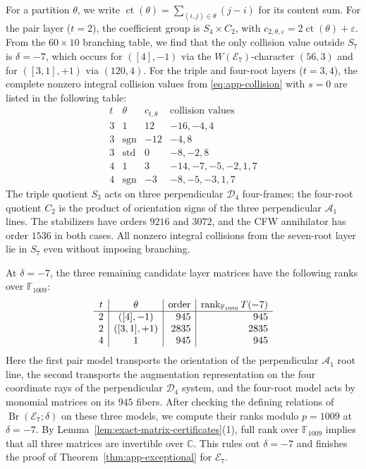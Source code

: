 \documentclass[11pt,a4paper]{amsart}
\newcommand{\C}{\mathbb C}\newcommand{\Q}{\mathbb Q}\newcommand{\Z}{\mathbb Z}
\newcommand{\Br}{\operatorname{Br}}\newcommand{\Irr}{\operatorname{Irr}}
\theoremstyle{uprightdefinition}
\theoremstyle{remark}\newtheorem{remark}[theorem]{Remark}
\begin{document}
For a partition $\theta$, we write
$\operatorname{ct}(\theta)=\sum_{(i,j)\in\theta}(j-i)$ for its content sum. For the pair layer ($t=2$), the coefficient group is
$S_4\times C_2$, with
$c_{2,\theta,\varepsilon}=2\operatorname{ct}(\theta)+\varepsilon$.
From the $60\times10$ branching table, we find that the only collision value outside $S_7$ is $\delta=-7$, which occurs for
$([4],-1)$ via the $W(\mathscr{E}_7)$-character $(56,3)$ and for
$([3,1],+1)$ via $(120,4)$.
For the triple and four-root layers ($t=3,4$), the complete nonzero integral
collision values from \eqref{eq:app-collision} with $s=0$ are listed in the following table:
\[
\begin{array}{c|c|r|l}
 t&\theta&c_{t,\theta}&\text{collision values}\\\hline
 3&1&12&-16,-4,4\\
 3&\mathrm{sgn}&-12&-4,8\\
 3&\mathrm{std}&0&-8,-2,8\\
 4&1&3&-14,-7,-5,-2,1,7\\
 4&\mathrm{sgn}&-3&-8,-5,-3,1,7
\end{array}
\]
The triple quotient $S_3$ acts on three perpendicular $\mathscr{D}_4$ four-frames;
the four-root quotient $C_2$ is the product of orientation signs of the
three perpendicular $\mathscr{A}_1$ lines. The stabilizers have orders $9216$ and
$3072$, and the CFW annihilator has order $1536$ in both cases.
All nonzero integral collisions from the seven-root layer lie in $S_7$
even without imposing branching.

At $\delta=-7$, the three remaining candidate layer matrices have the following ranks over $\mathbb F_{1009}$:
\[
\begin{array}{c|c|r|r}
 t&\theta&\text{order}&\operatorname{rank}_{\mathbb F_{1009}}T(-7)\\\hline
 2&([4],-1)&945&945\\
 2&([3,1],+1)&2835&2835\\
 4&1&945&945
\end{array}
\]
Here the first pair model transports the orientation of the perpendicular
$\mathscr{A}_1$ root line, the second transports the augmentation representation on the
four coordinate rays of the perpendicular $\mathscr{D}_4$ system, and the four-root
model acts by monomial matrices on its $945$ fibers. After checking the defining
relations of $\Br(\mathscr{E}_7;\delta)$ on these three models, we compute their ranks modulo $p=1009$ at $\delta=-7$. By Lemma~\ref{lem:exact-matrix-certificates}(1), full rank over $\mathbb F_{1009}$
implies that all three matrices are invertible over $\C$. This rules out $\delta=-7$ and finishes the proof of Theorem~\ref{thm:app-exceptional} for $\mathscr{E}_7$.
\end{document}
